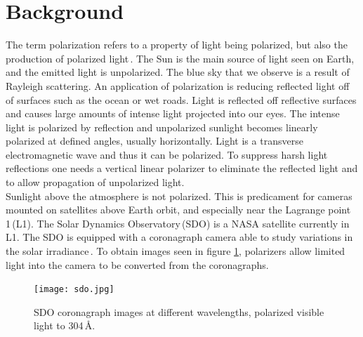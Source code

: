 \documentclass[aps,prl,twocolumn,superscriptaddress,nofootinbib]{revtex4-1}
\begin{document}
\maketitle    %


\section{Background}

The term polarization refers to a property of light being polarized, but also the production of polarized light\,\cite{2}. The Sun is the main source of light seen on Earth, and the emitted light is unpolarized. The blue sky that we observe is a result of Rayleigh scattering. An application of polarization is reducing reflected light off of surfaces such as the ocean or wet roads. Light is reflected off reflective surfaces and causes large amounts of intense light projected into our eyes. The intense light is polarized by reflection and unpolarized sunlight becomes linearly polarized at defined angles, usually horizontally. Light is a transverse electromagnetic wave and thus it can be polarized. To suppress harsh light reflections one needs a vertical linear polarizer to eliminate the reflected light and to allow propagation of unpolarized light.
\\
\indent Sunlight above the atmosphere is not polarized. This is predicament for cameras mounted on satellites above Earth orbit, and especially near the Lagrange point 1\,(L1). The Solar Dynamics Observatory\,(SDO) is a NASA satellite currently in L1. The SDO is equipped with a coronagraph camera able to study variations in the solar irradiance\,\cite{3}. To obtain images seen in figure \ref{sdo}, polarizers allow limited light into the camera to be converted from the coronagraphs.

\begin{figure}[h!]
  \begin{center}
\centerline{\texttt{[image: sdo.jpg]}}
\caption{\small{SDO coronagraph images at different wavelengths, polarized visible light to 304\,\AA. \label{sdo}}}
  \end{center}
\end{figure}



\end{document}
